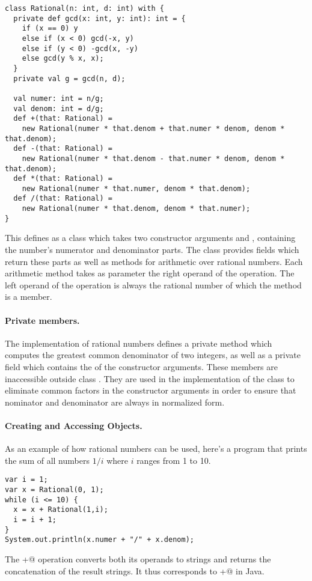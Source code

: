 \documentclass[11pt]{book}
\begin{document}
\begin{verbatim}
class Rational(n: int, d: int) with {
  private def gcd(x: int, y: int): int = {
    if (x == 0) y
    else if (x < 0) gcd(-x, y)
    else if (y < 0) -gcd(x, -y)
    else gcd(y % x, x);
  }
  private val g = gcd(n, d);

  val numer: int = n/g;
  val denom: int = d/g;
  def +(that: Rational) =
    new Rational(numer * that.denom + that.numer * denom, denom * that.denom);
  def -(that: Rational) =
    new Rational(numer * that.denom - that.numer * denom, denom * that.denom);
  def *(that: Rational) =
    new Rational(numer * that.numer, denom * that.denom);
  def /(that: Rational) =
    new Rational(numer * that.denom, denom * that.numer);
}
\end{verbatim}
This defines \verb@Rational@ as a class which takes two constructor
arguments \verb@n@ and \verb@d@, containing the number's numerator and
denominator parts.  The class provides fields which return these parts
as well as methods for arithmetic over rational numbers.  Each
arithmetic method takes as parameter the right operand of the
operation. The left operand of the operation is always the rational
number of which the method is a member.

\paragraph{Private members.}
The implementation of rational numbers defines a private method
\verb@gcd@ which computes the greatest common denominator of two
integers, as well as a private field \verb@g@ which contains the
\verb@gcd@ of the constructor arguments. These members are inaccessible
outside class \verb@Rational@. They are used in the implementation of
the class to eliminate common factors in the constructor arguments in
order to ensure that nominator and denominator are always in
normalized form.

\paragraph{Creating and Accessing Objects.}
As an example of how rational numbers can be used, here's a program
that prints the sum of all numbers $1/i$ where $i$ ranges from 1 to 10.
\begin{verbatim}
var i = 1;
var x = Rational(0, 1);
while (i <= 10) {
  x = x + Rational(1,i);
  i = i + 1;
}
System.out.println(x.numer + "/" + x.denom);
\end{verbatim}
The \verb@+@ operation converts both its operands to strings and returns the
concatenation of the result strings. It thus corresponds to \verb@+@ in Java. 
  
\end{document}
